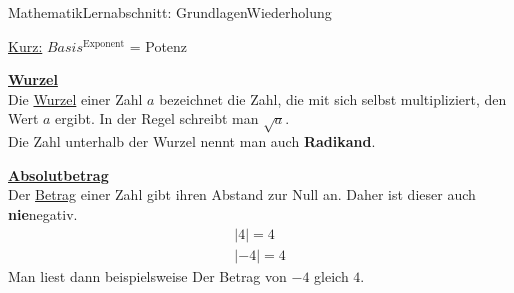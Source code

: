 \documentclass[11pt,twocolumn,oneside,openany,headings=optiontotoc,11pt,numbers=noenddot]{article}
\begin{document}
\begin{worksheet}{Mathematik}{Lernabschnitt: Grundlagen}{Wiederholung}
		\begin{framed}
			\noindent
			\underline{Kurz:} \(Basis^{\text{Exponent}}\) = Potenz
		\end{framed}
		\noindent
		\underline{\textbf{Wurzel}}\\
		Die \underline{Wurzel} einer Zahl \(a\) bezeichnet die Zahl, die mit sich selbst multipliziert, den Wert \(a\) ergibt. In der Regel schreibt man \(\sqrt{a}\).\\
		Die Zahl unterhalb der Wurzel nennt man auch \textbf{Radikand}.\\
		\par\noindent
		\underline{\textbf{Absolutbetrag}}\\
		Der \underline{Betrag} einer Zahl gibt ihren \grqq{}Abstand\grqq{} zur Null an. Daher ist dieser auch \textbf{nie}negativ.
		\begin{align*}
			|4| = 4\\
			|-4| = 4
		\end{align*}
		Man liest dann beispielsweise \glqq{}Der Betrag von \(-4\) gleich \(4\)\grqq{}.

\end{worksheet}
\end{document}
